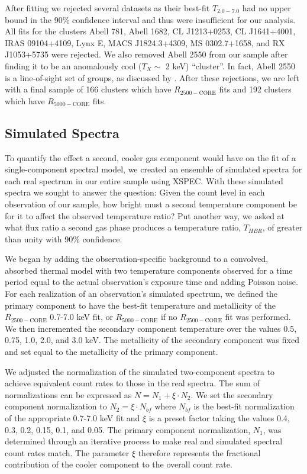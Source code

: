 \documentclass[12pt,preprint]{aastex}
\begin{document}
After fitting we rejected several datasets as their best-fit $T_{2.0-7.0}$
had no upper bound in the 90\% confidence interval and thus were
insufficient for our analysis. All fits for the clusters Abell 781,
Abell 1682, CL J1213+0253, CL J1641+4001, IRAS 09104+4109, Lynx E,
MACS J1824.3+4309, MS 0302.7+1658, and RX J1053+5735 were rejected. We
also removed Abell 2550 from our sample after finding it to be an
anomalously cool ($T_{X} \sim$ 2 keV) ``cluster''. In fact, Abell 2550
is a line-of-sight set of groups, as discussed by
\cite{2004cgpc.sympE..31M}. After these rejections, we are left with
a final sample of 166 clusters which have $R_{2500-\mathrm{CORE}}$
fits and 192 clusters which have $R_{5000-\mathrm{CORE}}$ fits.

\subsection{Simulated Spectra}\label{sec:simulated}

To quantify the effect a second, cooler gas component would have on
the fit of a single-component spectral model, we created an ensemble
of simulated spectra for each real spectrum in our entire sample using
{\textsc{XSPEC}}. With these simulated spectra we sought to answer the
question: Given the count level in each observation of our sample, how
bright must a second temperature component be for it to affect the
observed temperature ratio? Put another way, we asked at what flux
ratio a second gas phase produces a temperature ratio, $T_{HBR}$, of
greater than unity with 90\% confidence.

We began by adding the observation-specific background to a convolved,
absorbed thermal model with two temperature components observed for a
time period equal to the actual observation's exposure time and adding Poisson
noise. For each realization of an observation's simulated spectrum, we
defined the primary component to have the best-fit temperature and
metallicity of the $R_{2500-\mathrm{CORE}}$ 0.7-7.0 keV fit, or
$R_{5000-\mathrm{CORE}}$ if no $R_{2500-\mathrm{CORE}}$ fit was
performed. We then incremented the secondary component temperature
over the values 0.5, 0.75, 1.0, 2.0, and 3.0 keV. The metallicity of
the secondary component was fixed and set equal to the metallicity of
the primary component.

We adjusted the normalization of the simulated two-component spectra to
achieve equivalent count rates to those in the real spectra. The sum
of normalizations can be expressed as $N = N_1 + \xi \cdot N_2$. We
set the secondary component normalization to $N_2 = \xi \cdot N_{bf}$
where $N_{bf}$ is the best-fit normalization of the appropriate
0.7-7.0 keV fit and $\xi$ is a preset factor taking the values 0.4,
0.3, 0.2, 0.15, 0.1, and 0.05. The primary component normalization,
$N_1$, was determined through an iterative process to make real and
simulated spectral count rates match. The parameter $\xi$ therefore
represents the fractional contribution of the cooler component to the
overall count rate.
\end{document}
